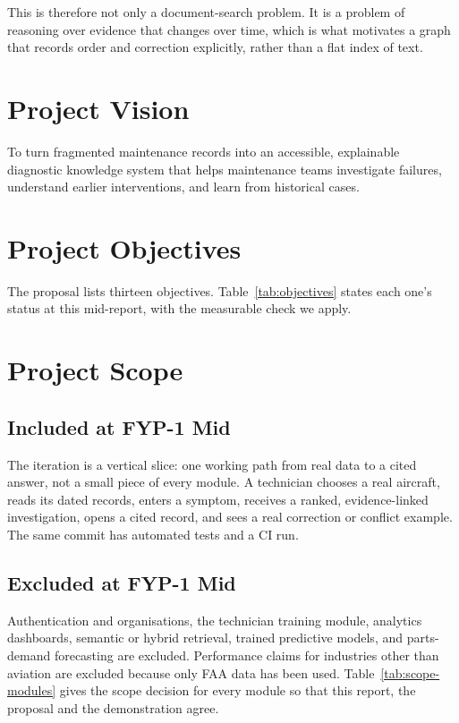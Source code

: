 This is therefore not only a document-search problem. It is a problem of reasoning over evidence that changes over time, which is what motivates a graph that records order and correction explicitly, rather than a flat index of text.

\section{Project Vision}

To turn fragmented maintenance records into an accessible, explainable diagnostic knowledge system that helps maintenance teams investigate failures, understand earlier interventions, and learn from historical cases.

\section{Project Objectives}

The proposal lists thirteen objectives. Table~\ref{tab:objectives} states each one's status at this mid-report, with the measurable check we apply.



\section{Project Scope}

\subsection{Included at FYP-1 Mid}

The iteration is a vertical slice: one working path from real data to a cited answer, not a small piece of every module. A technician chooses a real aircraft, reads its dated records, enters a symptom, receives a ranked, evidence-linked investigation, opens a cited record, and sees a real correction or conflict example. The same commit has automated tests and a CI run.

\subsection{Excluded at FYP-1 Mid}

Authentication and organisations, the technician training module, analytics dashboards, semantic or hybrid retrieval, trained predictive models, and parts-demand forecasting are excluded. Performance claims for industries other than aviation are excluded because only FAA data has been used. Table~\ref{tab:scope-modules} gives the scope decision for every module so that this report, the proposal and the demonstration agree.

